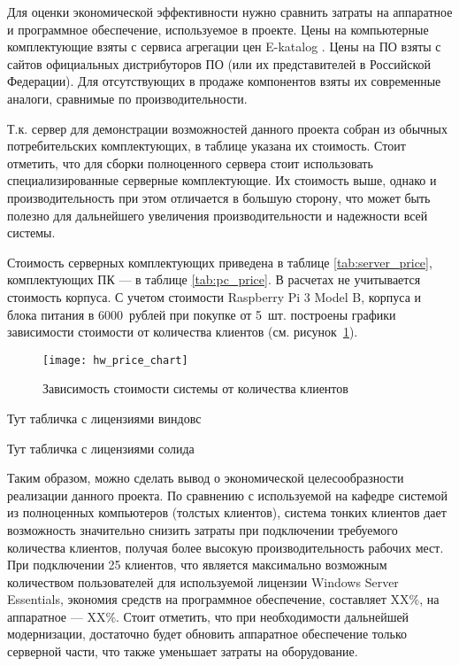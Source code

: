 Для оценки экономической эффективности нужно сравнить затраты на аппаратное и
программное обеспечение, используемое в проекте. Цены на компьютерные комплектующие
взяты с сервиса агрегации цен E-katalog \cite{ref:eeekatalog}. Цены на ПО взяты с сайтов
официальных дистрибуторов ПО (или их представителей в Российской Федерации).  Для
отсутствующих в продаже компонентов взяты их современные аналоги, сравнимые по
производительности.

Т.к. сервер для демонстрации возможностей данного проекта собран из обычных
потребительских комплектующих, в таблице указана их стоимость. Стоит отметить, что для
сборки полноценного сервера стоит использовать специализированные серверные 
комплектующие. Их стоимость выше, однако и производительность при этом отличается в
большую сторону, что может быть полезно для дальнейшего увеличения производительности и
надежности всей системы.

Стоимость серверных комплектующих приведена в таблице \ref{tab:server_price},
комплектующих ПК — в таблице \ref{tab:pc_price}. В расчетах не учитывается стоимость
корпуса. С учетом стоимости Raspberry Pi 3 Model B, корпуса и блока питания в
6000~рублей при покупке от 5~шт. \cite{ref:raspberry_price} построены графики
зависимости стоимости от количества клиентов (см. рисунок~\ref{pic:hw_price_chart}).

\begin{figure}[h]
    \center
    \texttt{[image: hw\_price\_chart]}
    \caption{Зависимость стоимости системы от количества клиентов}
    \label{pic:hw_price_chart}
\end{figure}

Тут табличка с лицензиями виндовс

Тут табличка с лицензиями солида

Таким образом, можно сделать вывод о экономической целесообразности реализации данного
проекта. По сравнению с используемой на кафедре системой из полноценных компьютеров
(толстых клиентов), система тонких клиентов дает возможность значительно снизить затраты
при подключении требуемого количества клиентов, получая более высокую производительность
рабочих мест.
При подключении 25 клиентов, что является максимально возможным количеством
пользователей для используемой лицензии Windows Server Essentials, экономия средств на
программное обеспечение, составляет XX\%, на аппаратное — XX\%. Стоит отметить, что при
необходимости дальнейшей модернизации, достаточно будет обновить аппаратное обеспечение
только серверной части, что также уменьшает затраты на оборудование.
